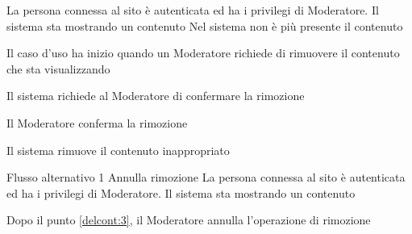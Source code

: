 {}
{La persona connessa al sito è autenticata ed ha i privilegi di Moderatore. Il sistema sta mostrando un \gls{contenuto}}
{Nel sistema non è più presente il \gls{contenuto}}
{\begin{enumCU}
	\item Il caso d'uso ha inizio quando un Moderatore richiede di rimuovere il contenuto che sta visualizzando\label{rim2}
	\item Il sistema richiede al Moderatore di confermare la rimozione\label{delcont:3}
	\item Il Moderatore conferma la rimozione 
	\item Il sistema rimuove il contenuto inappropriato
\end{enumCU}}
%
{Flusso alternativo 1}%
{Annulla rimozione}%
{La persona connessa al sito è autenticata ed ha i privilegi di Moderatore. Il sistema sta mostrando un \gls{contenuto}}
{\postNulle}%
{\begin{enumCU}
		\item Dopo il punto \ref{delcont:3}, il Moderatore annulla l'operazione di rimozione
\end{enumCU}}%


